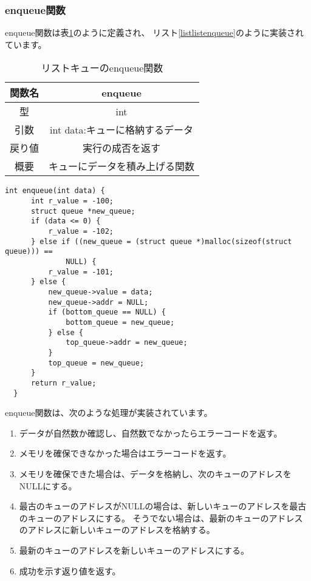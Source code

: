 \documentclass[a4j]{jarticle}
\begin{document}
\subsubsection{enqueue関数}
enqueue関数は表\ref{table:listenqueue}のように定義され、
リスト\ref{listlistenqueue}のように実装されています。

\begin{table}[htbp]
  \centering
  \caption{リストキューのenqueue関数}
  \label{table:listenqueue}
  \begin{tabular}{|c|c|}
    \hline
    関数名 & enqueue              \\
    \hline
    型   & int                  \\
    \hline
    引数  & int data:キューに格納するデータ \\
    \hline
    戻り値 & 実行の成否を返す             \\
    \hline
    概要  & キューにデータを積み上げる関数      \\
    \hline
  \end{tabular}
\end{table}

\begin{lstlisting}[caption=リストキューのenqueue関数の実装,label=listlistenqueue]
  int enqueue(int data) {
      int r_value = -100;
      struct queue *new_queue;
      if (data <= 0) {
          r_value = -102;
      } else if ((new_queue = (struct queue *)malloc(sizeof(struct queue))) ==
              NULL) {
          r_value = -101;
      } else {
          new_queue->value = data;
          new_queue->addr = NULL;
          if (bottom_queue == NULL) {
              bottom_queue = new_queue;
          } else {
              top_queue->addr = new_queue;
          }
          top_queue = new_queue;
      }
      return r_value;
  }
\end{lstlisting}

enqueue関数は、次のような処理が実装されています。
\begin{enumerate}
  \item データが自然数か確認し、自然数でなかったらエラーコードを返す。
  \item メモリを確保できなかった場合はエラーコードを返す。
  \item メモリを確保できた場合は、データを格納し、次のキューのアドレスをNULLにする。
  \item 最古のキューのアドレスがNULLの場合は、新しいキューのアドレスを最古のキューのアドレスにする。
        そうでない場合は、最新のキューのアドレスのアドレスに新しいキューのアドレスを格納する。
  \item 最新のキューのアドレスを新しいキューのアドレスにする。
  \item 成功を示す返り値を返す。
\end{enumerate}
\end{document}
